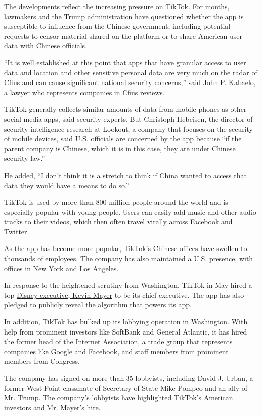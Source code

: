 The developments reflect the increasing pressure on TikTok. For months,
lawmakers and the Trump administration have questioned whether the app
is susceptible to influence from the Chinese government, including
potential requests to censor material shared on the platform or to share
American user data with Chinese officials.

``It is well established at this point that apps that have granular
access to user data and location and other sensitive personal data are
very much on the radar of Cfius and can cause significant national
security concerns,'' said John P. Kabaelo, a lawyer who represents
companies in Cfius reviews.

TikTok generally collects similar amounts of data from mobile phones as
other social media apps, said security experts. But Christoph Hebeisen,
the director of security intelligence research at Lookout, a company
that focuses on the security of mobile devices, said U.S. officials are
concerned by the app because ``if the parent company is Chinese, which
it is in this case, they are under Chinese security law.''

He added, ``I don't think it is a stretch to think if China wanted to
access that data they would have a means to do so.''

TikTok is used by more than 800 million people around the world and is
especially popular with young people. Users can easily add music and
other audio tracks to their videos, which then often travel virally
across Facebook and Twitter.

As the app has become more popular, TikTok's Chinese offices have
swollen to thousands of employees. The company has also maintained a
U.S. presence, with offices in New York and Los Angeles.

In response to the heightened scrutiny from Washington, TikTok in May
hired a top
\href{https://www.nytimes3xbfgragh.onion/2020/05/18/business/media/tiktok-ceo-kevin-mayer.html}{Disney
executive, Kevin Mayer} to be its chief executive. The app has also
pledged to publicly reveal the algorithm that powers its app.

In addition, TikTok has bulked up its lobbying operation in Washington.
With help from prominent investors like SoftBank and General Atlantic,
it has hired the former head of the Internet Association, a trade group
that represents companies like Google and Facebook, and staff members
from prominent members from Congress.

The company has signed on more than 35 lobbyists, including David J.
Urban, a former West Point classmate of Secretary of State Mike Pompeo
and an ally of Mr. Trump. The company's lobbyists have highlighted
TikTok's American investors and Mr. Mayer's hire.

